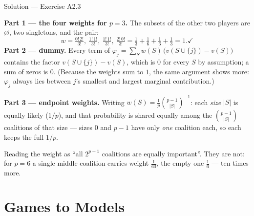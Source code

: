 \documentclass[aspectratio=169,11pt]{beamer}
\begin{document}
\begin{frame}{Solution --- Exercise A2.3}
\begin{solutionbox}
  \textbf{Part 1 --- the four weights for $p=3$.} The subsets of the other two
  players are $\varnothing$, two singletons, and the pair:
  \[
    w = \tfrac{0!\,2!}{3!},\ \tfrac{1!\,1!}{3!},\ \tfrac{1!\,1!}{3!},\ \tfrac{2!\,0!}{3!}
      = \tfrac13 + \tfrac16 + \tfrac16 + \tfrac13 = 1. \checkmark
  \]
  \textbf{Part 2 --- dummy.} Every term of
  $\varphi_j=\sum_S w(S)\,\bigl(v(S\cup\{j\})-v(S)\bigr)$ contains the factor
  $v(S\cup\{j\})-v(S)$, which is $0$ for every $S$ by assumption; a sum of zeros
  is $0$. (Because the weights sum to $1$, the same argument shows more: $\varphi_j$
  always lies between $j$'s smallest and largest marginal contribution.)

  \medskip
  \textbf{Part 3 --- endpoint weights.} Writing $w(S)=\frac1p\binom{p-1}{|S|}^{-1}$:
  each \emph{size} $|S|$ is equally likely ($1/p$), and that probability is shared
  equally among the $\binom{p-1}{|S|}$ coalitions of that size --- sizes $0$ and
  $p-1$ have only \emph{one} coalition each, so each keeps the full $1/p$.
\end{solutionbox}
\begin{mistake}
  Reading the weight as ``all $2^{p-1}$ coalitions are equally important''. They are
  not: for $p=6$ a single middle coalition carries weight $\tfrac1{60}$, the empty one
  $\tfrac16$ --- ten times more.
\end{mistake}
\end{frame}

\section{Games to Models}
\end{document}
